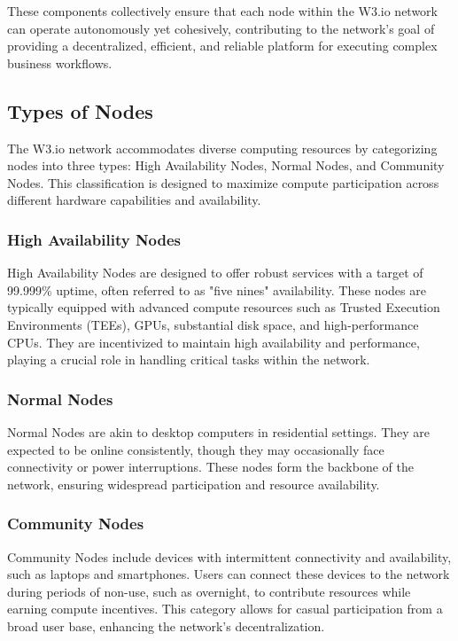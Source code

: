 \documentclass[11pt]{article}
\begin{document}
These components collectively ensure that each node within the W3.io network can operate autonomously yet cohesively, contributing to the network's goal of providing a decentralized, efficient, and reliable platform for executing complex business workflows.


\subsection{Types of Nodes}
The W3.io network accommodates diverse computing resources by categorizing nodes into three types: High Availability Nodes, Normal Nodes, and Community Nodes. This classification is designed to maximize compute participation across different hardware capabilities and availability.

\subsubsection{High Availability Nodes}
High Availability Nodes are designed to offer robust services with a target of 99.999\% uptime, often referred to as "five nines" availability. These nodes are typically equipped with advanced compute resources such as Trusted Execution Environments (TEEs), GPUs, substantial disk space, and high-performance CPUs. They are incentivized to maintain high availability and performance, playing a crucial role in handling critical tasks within the network.

\subsubsection{Normal Nodes}
Normal Nodes are akin to desktop computers in residential settings. They are expected to be online consistently, though they may occasionally face connectivity or power interruptions. These nodes form the backbone of the network, ensuring widespread participation and resource availability.

\subsubsection{Community Nodes}
Community Nodes include devices with intermittent connectivity and availability, such as laptops and smartphones. Users can connect these devices to the network during periods of non-use, such as overnight, to contribute resources while earning compute incentives. This category allows for casual participation from a broad user base, enhancing the network's decentralization.
\end{document}
